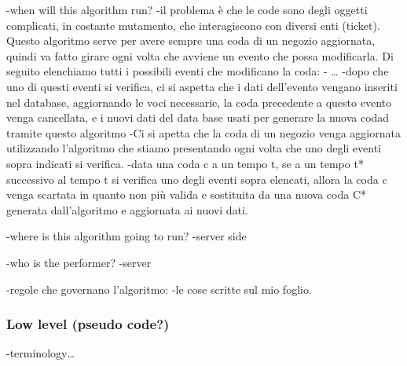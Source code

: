 -when will this algorithm run?
    -il problema è che le code sono degli oggetti complicati, in costante mutamento, che interagiscono con diversi enti (ticket). Questo algoritmo serve per avere sempre una coda di un negozio aggiornata, quindi va fatto girare ogni volta che avviene un evento che possa modificarla. Di seguito elenchiamo tutti i possibili eventi che modificano la coda:
        - \dots
    -dopo che uno di questi eventi si verifica, ci si aspetta che i dati dell'evento vengano inseriti nel database, aggiornando le voci necessarie, la coda precedente a questo evento venga cancellata, e i nuovi dati del data base usati per generare la nuova codad tramite questo algoritmo 
    -Ci si apetta che la coda di un negozio venga aggiornata utilizzando l'algoritmo che stiamo presentando ogni volta che uno degli eventi sopra indicati si verifica.
    -data una coda c a un tempo t, se a un tempo t* successivo al tempo t si verifica uno degli eventi sopra elencati, allora la coda c venga scartata in quanto non più valida e sostituita da una nuova coda C* generata dall'algoritmo e aggiornata ai nuovi dati.

-where is this algorithm going to run?
    -server side

-who is the performer?
    -server

-regole che governano l'algoritmo:
    -le cose scritte sul mio foglio.

\subsubsection{Low level (pseudo code?)}
\label{subsubsect:lowlevel}

-terminology\dots


